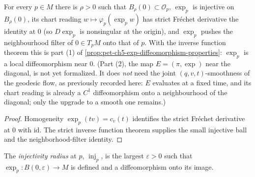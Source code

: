 \begin{lemma}
  \label{lem:pet-ch5-exp-differential-nonsingular}


  For every $p\in M$ there is $\rho>0$ such that $B_\rho(0)\subset\mathcal O_p$,
  $\exp_p$ is injective on $B_\rho(0)$, its chart reading $w\mapsto\varphi_p(\exp_p
  w)$ has strict Fréchet derivative the identity at $0$ (so $D\exp_p$ is nonsingular
  at the origin), and $\exp_p$ pushes the neighbourhood filter of $0\in T_pM$ onto
  that of $p$.  With the inverse function theorem this is part (1) of
  \cref{prop:pet-ch5-exp-diffeomorphism-properties}: $\exp_p$ is a local
  diffeomorphism near $0$.  (Part (2), the map $E=(\pi,\exp)$ near the diagonal, is
  not yet formalized.  It does \emph{not} need the joint $(q,v,t)$-smoothness of the
  geodesic flow, as previously recorded here: $E$ evaluates at a fixed time, and its
  chart reading is already a $C^1$ diffeomorphism onto a neighbourhood of the
  diagonal; only the upgrade to a smooth one remains.)
\end{lemma}
\begin{proof}

  \sketch
  Homogeneity $\exp_p(tv)=c_v(t)$ identifies the strict Fréchet derivative at
  $0$ with $\mathrm{id}$.  The strict inverse function theorem supplies the small
  injective ball and the neighborhood-filter identity.
\end{proof}

\begin{definition}
  \label{def:pet-ch5-injectivity-radius}


  The \emph{injectivity radius} at $p$, $\operatorname{inj}_p$, is the largest
  $\varepsilon>0$ such that $\exp_p:B(0,\varepsilon)\to M$ is defined and a
  diffeomorphism onto its image.
\end{definition}

